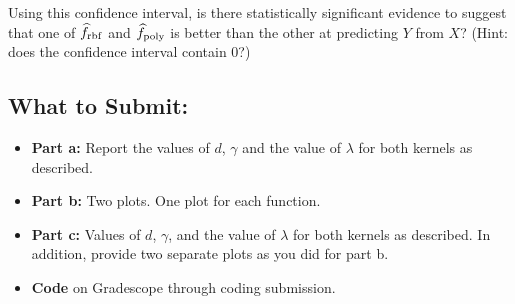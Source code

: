 \documentclass{article}
\begin{document}
\begin{aprob}
\begin{enumerate}
        \medskip
        
        Using this confidence interval, is there statistically significant evidence to suggest that one of $\widehat{f}_{\rm rbf}$ and $\widehat{f}_{\rm poly}$ is better than the other at predicting $Y$ from $X$? (Hint: does the confidence interval contain $0$?)
        \fi
        
    \end{enumerate}
    \subsection*{What to Submit:}
    \begin{itemize}
        \item \textbf{Part a:} Report the values of $d$, $\gamma$ and the value of $\lambda$ for both kernels as described.
        \item \textbf{Part b:} Two plots. One plot for each function.
        \item \textbf{Part c:} Values of $d$, $\gamma$, and the value of $\lambda$ for both kernels as described. In addition, provide two separate plots as you did for part b. 
        \item \textbf{Code} on Gradescope through coding submission.
    \end{itemize}
\end{aprob}

\iffalse
\end{document}
